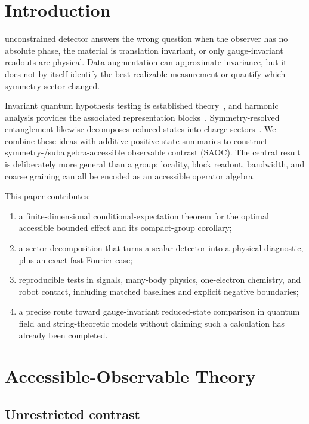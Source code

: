 \documentclass[letterpaper,journal]{IEEEtran}
\newcommand{\SAOC}{\textsc{SAOC}}
\begin{document}
\section{Introduction}

 unconstrained detector answers the wrong question when the
observer has no absolute phase, the material is translation invariant, or
only gauge-invariant readouts are physical. Data augmentation can approximate
invariance, but it does not by itself identify the best realizable measurement
or quantify which symmetry sector changed.

Invariant quantum hypothesis testing is established
theory~\cite{hiai2009}, and harmonic analysis provides the associated
representation blocks~\cite{serre1977,marvian2014}. Symmetry-resolved
entanglement likewise decomposes reduced states into charge
sectors~\cite{goldstein2018}. We combine these ideas with additive
positive-state summaries to construct symmetry-/subalgebra-accessible
observable contrast (\SAOC). The central result is deliberately more general
than a group: locality, block readout, bandwidth, and coarse graining can all
be encoded as an accessible operator algebra.

This paper contributes:

\begin{enumerate}
\item a finite-dimensional conditional-expectation theorem for the optimal
accessible bounded effect and its compact-group corollary;
\item a sector decomposition that turns a scalar detector into a physical
diagnostic, plus an exact fast Fourier case;
\item reproducible tests in signals, many-body physics, one-electron
chemistry, and robot contact, including matched baselines and explicit
negative boundaries;
\item a precise route toward gauge-invariant reduced-state comparison in
quantum field and string-theoretic models without claiming such a calculation
has already been completed.
\end{enumerate}

\section{Accessible-Observable Theory}

\subsection{Unrestricted contrast}
\end{document}

